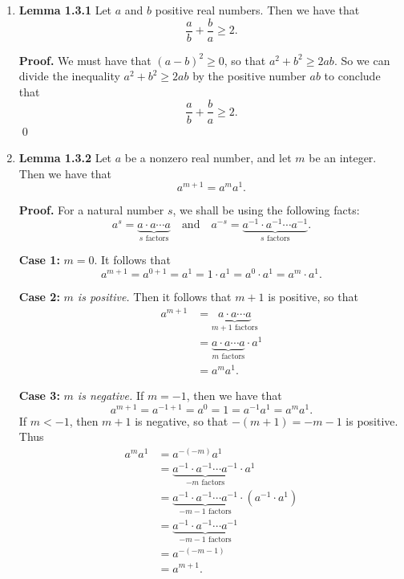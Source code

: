 \begin{enumerate}
   \item[]        \textbf{Lemma 1.3.1} Let $a$ and $b$ positive real numbers.
                  Then we have that
                  $$\frac{a}{b} + \frac{b}{a} \ge 2.$$

      \textbf{Proof.} We must have that $(a - b)^2 \ge 0$, so that
      $a^2 + b^2 \ge 2ab$. So we can divide the inequality $a^2 + b^2 \ge 2ab$
      by the positive number $ab$ to conclude that
      $$\frac{a}{b} + \frac{b}{a} \ge 2.$$ \qed
   \item[]        \textbf{Lemma 1.3.2} Let $a$ be a nonzero real number, and let
                  $m$ be an integer. Then we have that
                  $$a^{m+1} = a^ma^1.$$

      \textbf{Proof.}  For a natural number $s$, we shall be using the following 
      facts:
      $$a^s = \underbrace{a \cdot a \cdots a}_{s \text{ factors}} \quad
        \text{and} \quad a^{-s} = \underbrace{a^{-1} \cdot a^{-1}\cdots
        a^{-1}}_{s \text{ factors}}.$$

      \textbf{Case 1:} \textit{$m = 0$}. It follows that
      $$a^{m+1} = a^{0+1} = a^1 = 1\cdot a^1 = a^0 \cdot a^1 = a^m \cdot a^1.$$

      \textbf{Case 2:} \textit{$m$ is positive.} Then it follows that $m + 1$ is 
      positive, so that
      \begin{align*}
         a^{m + 1} &= \underbrace{a \cdot a \cdots a}_{m+1\text{ factors}} \\
            &= \underbrace{a \cdot a \cdots a}_{m\text{ factors}} \cdot a^1 \\
            &= a^ma^1.
      \end{align*}

      \textbf{Case 3:} \textit{$m$ is negative.} If $m = -1$, then we have that
      $$a^{m+1} = a^{-1+1} = a^0 = 1 = a^{-1}a^1 = a^ma^1.$$
      If $m < -1$, then $m + 1$ is negative, so that $-(m + 1) = -m - 1$ is 
      positive. Thus
      \begin{align*}
         a^ma^1 &= a^{-(-m)}a^1 \\
                &= \underbrace{a^{-1} \cdot a^{-1} \cdots a^{-1}}_{
                   -m\text{ factors}} \cdot a^1 \\
                &= \underbrace{a^{-1} \cdot a^{-1} \cdots a^{-1}}_{
                   -m-1\text{ factors}} \cdot (a^{-1} \cdot a^1) \\
                &= \underbrace{a^{-1} \cdot a^{-1} \cdots a^{-1}}_{
                   -m-1\text{ factors}} \\
                &= a^{-(-m-1)} \\
                &= a^{m+1}.
      \end{align*}


\end{enumerate}
